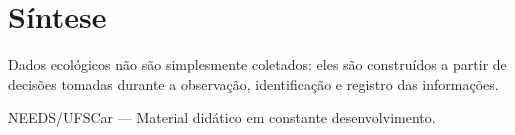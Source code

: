 \documentclass[
  letterpaper,
  DIV=11,
  numbers=noendperiod]{scrartcl}
\begin{document}
\section{Síntese}\label{suxedntese}

Dados ecológicos não são simplesmente coletados: eles são construídos a
partir de decisões tomadas durante a observação, identificação e
registro das informações.

NEEDS/UFSCar --- Material didático em constante desenvolvimento.
\end{document}
